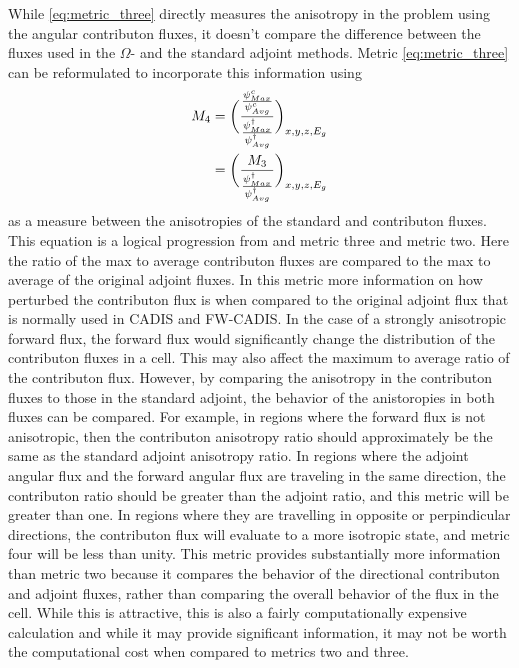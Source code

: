 While \ref{eq:metric_three} directly measures the anisotropy in the problem using
the angular contributon fluxes, it doesn't compare the difference
between the fluxes used
in the $\Omega$-  and the standard adjoint methods. Metric \ref{eq:metric_three}
can be
reformulated to incorporate this information using
%
\begin{equation}
  \begin{split}
    M_{4} & = \bigg( \frac{\frac{\psi^{c}_{Max}}{\psi^{c}_{
                  Avg}}}{\frac{\psi^{\dagger}_{
                  Max}}{\psi^{\dagger}_{Avg}}} \bigg)_{x,y,z,E_g} \\
          & = \bigg(\frac{M_{3}}{\frac{\psi^{\dagger}_{Max}}
                  {\psi^{\dagger}_{Avg}}} \bigg)_{x,y,z,E_g}
  \end{split}
  \label{eq:metric_four}
\end{equation}
%
as a measure between the anisotropies of the standard and contributon fluxes.
This equation is a logical progression from and metric three and
metric two. Here the ratio
of the max to average contributon fluxes are compared to the max to average of the
original adjoint fluxes. In this metric more information on how perturbed the
contributon flux is when compared to the original adjoint flux that is normally
used in CADIS and FW-CADIS.
In the case of a strongly anisotropic
forward flux, the forward flux  would significantly
change the distribution of the contributon
fluxes in a cell. This may also affect the maximum to average ratio
of the contributon flux. However, by comparing the anisotropy in the contributon
fluxes to those in the standard adjoint, the behavior of the anistoropies in
both fluxes can be compared. For example, in regions where the forward flux is
not anisotropic, then the contributon anisotropy ratio should approximately be
the same as the standard adjoint anisotropy ratio. In regions where the adjoint
angular flux and the forward angular flux are traveling in the same direction,
the contributon ratio should be greater than the adjoint ratio, and this metric
will be greater than one. In regions where they are travelling in opposite or
perpindicular directions, the contributon flux will evaluate to a more isotropic
state, and metric four will be less than unity. This metric
provides substantially more information than metric two because
it compares the behavior of the directional contributon and adjoint fluxes,
rather than comparing the overall behavior of the flux in the cell.
While this is attractive, this is also a fairly computationally
expensive calculation and while it may provide significant information, it may
not be worth the computational cost when compared to metrics two and three.

